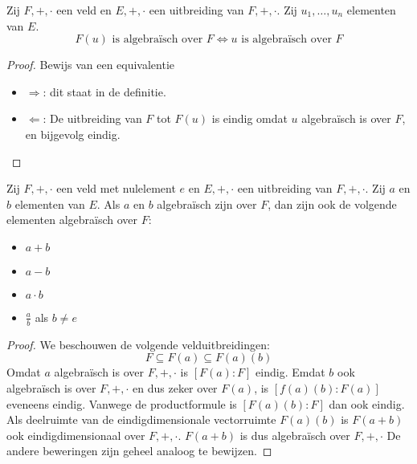 \documentclass[main.tex]{subfiles}
\begin{document}
\begin{st}
\label{st:element-asa-uitbreiding-algebraisch}
  Zij $F,+,\cdot$ een veld en $E,+,\cdot$ een uitbreiding van $F,+,\cdot$.
  Zij $u_{1},\dotsc,u_{n}$ elementen van $E$.
  \[ F(u) \text{ is algebra\"isch over } F \Leftrightarrow u \text{ is algebra\"isch over } F \]

  \begin{proof}
    Bewijs van een equivalentie
    \begin{itemize}
    \item $\Rightarrow$: dit staat in de definitie.
    \item $\Leftarrow$: De uitbreiding van $F$ tot $F(u)$ is eindig omdat $u$ algebra\"isch is over $F$, en bijgevolg eindig.
    \end{itemize}
  \end{proof}
\end{st}

\begin{st}
  Zij $F,+,\cdot$ een veld met nulelement $e$ en $E,+,\cdot$ een uitbreiding van $F,+,\cdot$.
  Zij $a$ en $b$ elementen van $E$.
  Als $a$ en $b$ algebra\"isch zijn over $F$, dan zijn ook de volgende elementen algebra\"isch over $F$:
  \begin{itemize}
  \item $a+b$
  \item $a-b$
  \item $a\cdot b$
  \item $\frac{a}{b}$ als $b \neq e$
  \end{itemize}

  \begin{proof}
    We beschouwen de volgende velduitbreidingen:
    \[
    F \subseteq F(a) \subseteq F(a)(b)
    \]
    Omdat $a$ algebra\"isch is over $F,+,\cdot$ is $[F(a):F]$ eindig.
    Emdat $b$ ook algebra\"isch is over $F,+,\cdot$ en dus zeker over $F(a)$, is $[f(a)(b):F(a)]$ eveneens eindig.
    Vanwege de productformule is $[F(a)(b):F]$ dan ook eindig.
    Als deelruimte van de eindigdimensionale vectorruimte $F(a)(b)$ is $F(a+b)$ ook eindigdimensionaal over $F,+,\cdot$. $F(a+b)$ is dus algebra\"isch over $F,+,\cdot$
    De andere beweringen zijn geheel analoog te bewijzen.
  \end{proof}
\end{st}
\end{document}

